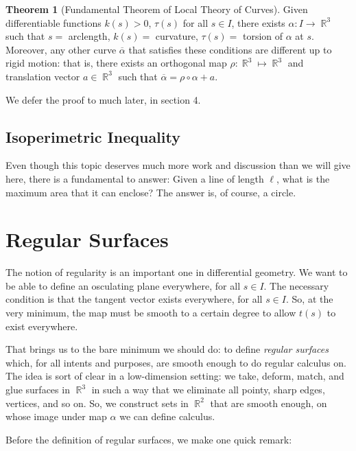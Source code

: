 \documentclass{amsart} %
\theoremstyle{mytheoremstyle}
\theoremstyle{definition}
\newtheorem{theorem}[definition]{Theorem}
\numberwithin{equation}{section}
\DeclareMathOperator{\R}{\mathbb{R}}
\DeclareMathOperator{\1}{\mathbbm{1}}
\begin{document}
\begin{theorem}[Fundamental Theorem of Local Theory of Curves]
	\label{thmFTLTC}
	Given differentiable functions $k(s) >0$, $\tau(s)$ for all $s \in I$, there exists $\alpha: I \to \R^3$ such that $s =$ arclength, $k(s) = $ curvature, $\tau(s)= $ torsion of $\alpha$ at $s$. Moreover, any other curve $\overline{\alpha}$ that satisfies these conditions are different up to rigid motion: that is, there exists an orthogonal map $\rho: \R^3 \mapsto \R^3$ and translation vector $a \in \R^3$ such that $\overline{\alpha} = \rho \circ \alpha + a$. 
\end{theorem}


We defer the proof to much later, in section 4.


\subsection{Isoperimetric Inequality}
Even though this topic deserves much more work and discussion than we will give here, there is a fundamental to answer: Given a line of length $\ell$, what is the maximum area that it can enclose? The answer is, of course, a circle. 



\clearpage
\section{Regular Surfaces}
The notion of regularity is an important one in differential geometry. We want to be able to define an osculating plane everywhere, for all $s \in I$. The necessary condition is that the tangent vector exists everywhere, for all $s \in I$. So, at the very minimum, the map must be smooth to a certain degree to allow $t(s) $ to exist everywhere.

That brings us to the bare minimum we should do: to define \textit{regular surfaces} which, for all intents and purposes, are smooth enough to do regular calculus on. The idea is sort of clear in a low-dimension setting: we take, deform, match, and glue surfaces in $\R^3$ in such a way that we eliminate all pointy, sharp edges, vertices, and so on. So, we construct sets in $\R^2$ that are smooth enough, on whose image under map $\alpha$ we can define calculus.

Before the definition of regular surfaces, we make one quick remark:
\end{document}
